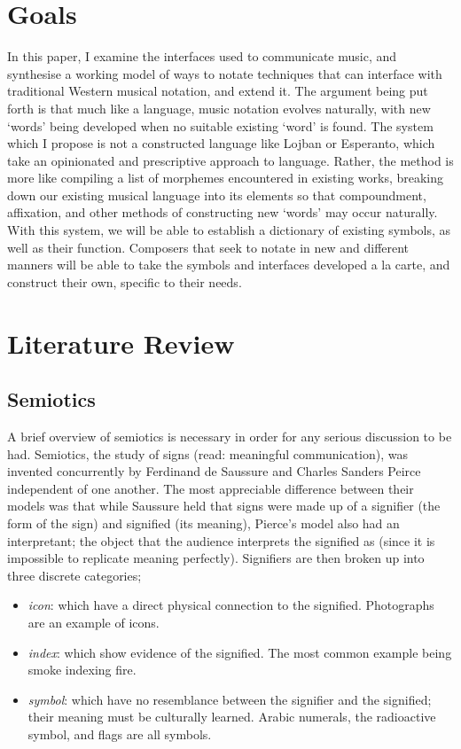 \section{Goals}

In this paper, I examine the interfaces used to communicate music, and synthesise a working model of ways to notate techniques that can interface with traditional Western musical notation, and extend it.
The argument being put forth is that much like a language, music notation evolves naturally, with new `words' being developed when no suitable existing `word' is found.
The system which I propose is not a constructed language like Lojban or Esperanto, which take an opinionated and prescriptive approach to language. 
Rather, the method is more like compiling a list of morphemes encountered in existing works, breaking down our existing musical language into its elements so that compoundment, affixation, and other methods of constructing new `words' may occur naturally.
With this system, we will be able to establish a dictionary of existing symbols, as well as their function.
Composers that seek to notate in new and different manners will be able to take the symbols and interfaces developed a la carte, and construct their own, specific to their needs.

\section{Literature Review}

\subsection{Semiotics}

A brief overview of semiotics is necessary in order for any serious discussion to be had.
Semiotics, the study of signs (read: meaningful communication), was invented concurrently by Ferdinand de Saussure and Charles Sanders Peirce independent of one another.
The most appreciable difference between their models was that while Saussure held that signs were made up of a signifier (the form of the sign) and signified (its meaning), Pierce's model also had an interpretant; the object that the audience interprets the signified as (since it is impossible to replicate meaning perfectly).
Signifiers are then broken up into three discrete categories; 
\begin{itemize}
\item \emph{\gls{icon}}: which have a direct physical connection to the signified. Photographs are an example of icons.
\item \emph{\gls{index}}: which show evidence of the signified. The most common example being smoke indexing fire.
\item \emph{\gls{symbol}}: which have no resemblance between the signifier and the signified; their meaning must be culturally learned. Arabic numerals, the radioactive symbol, and flags are all symbols.
\end{itemize}

